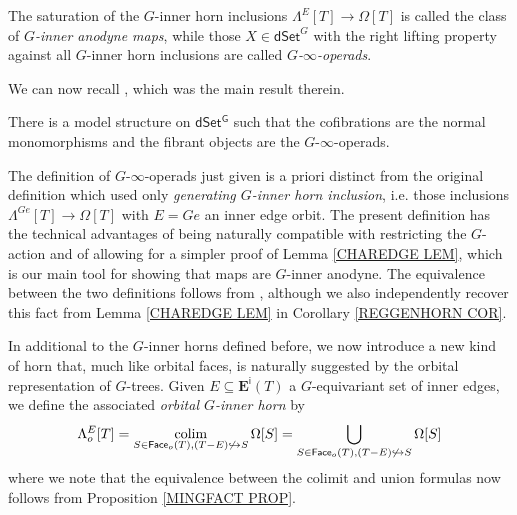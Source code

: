 \documentclass[a4paper,10pt
,draft
]{article}%
\begin{document}
The saturation of the $G$-inner horn inclusions 
$\Lambda^E[T] \to \Omega[T]$
is called the class of \textit{$G$-inner anodyne maps}, 
while those $X \in \mathsf{dSet}^G$
with the right lifting property against all $G$-inner horn inclusions are called \textit{$G$-$\infty$-operads}.

We can now recall \cite[Thm 2.1]{Per17}, which was the main result therein.

\begin{theorem}
	There is a model structure on $\mathsf{dSet^G}$
	such that the cofibrations are the normal monomorphisms and the fibrant objects are the $G$-$\infty$-operads.
\end{theorem}


\begin{remark}
The definition of $G$-$\infty$-operads just given is a priori distinct from the original definition \cite[Def. 6.12]{Per17} which used only 
\textit{generating $G$-inner horn inclusion}, i.e. 
those inclusions $\Lambda^{Ge}[T] \to \Omega[T]$ with $E=Ge$ an inner edge orbit.
The present definition has the technical advantages of being naturally compatible with restricting the $G$-action and of allowing for a simpler proof of Lemma \ref{CHAREDGE LEM}, 
which is our main tool for showing that maps
are $G$-inner anodyne.
The equivalence between the two definitions follows from 
\cite[Prop. 6.17]{Per17},
although we also independently recover this fact
from Lemma \ref{CHAREDGE LEM} in Corollary \ref{REGGENHORN COR}.
\end{remark}


In additional to the $G$-inner horns defined before, we now introduce a new kind of horn that, much like orbital faces,
is naturally suggested by the orbital representation of $G$-trees.
Given $E \subseteq \boldsymbol{E}^{\mathsf{i}}(T)$ a $G$-equivariant set of inner edges, we define the associated 
\textit{orbital $G$-inner horn} by
\[
	\Lambda^{E}_o[T] = 
	\mathop{\operatorname{colim}}_{S \in 
	\mathsf{Face}_o(T),
	(T - E) \not \hookrightarrow S}
	\Omega[S] =
	\bigcup_{S \in 
	\mathsf{Face}_o(T),
	(T - E) \not \hookrightarrow S}
	\Omega[S]
\]
where we note that the equivalence between the colimit and union formulas now follows from Proposition \ref{MINGFACT PROP}.
\end{document}

